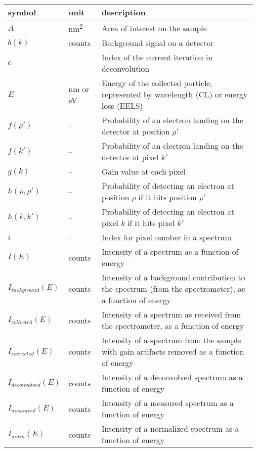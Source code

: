 \renewcommand{\arraystretch}{1.2}
\noindent 
\begin{longtable*}{l l p{11cm}} 
    \toprule
    \textbf{symbol} & \textbf{unit} & \textbf{description}\\
    \midrule 
    $A$ & \si{\nano\metre^2} & Area of interest on the sample\\
    $b(k)$ & counts & Background signal on a detector\\
    $c$ & -- & Index of the current iteration in deconvolution \\
    $E$ & \si{\nano\metre} or \si{\electronvolt} & Energy of the collected particle,
    represented by wavelength (CL) or energy loss (EELS)\\
    $f(\rho')$ & -- & Probability of an electron landing on the detector at position
    $\rho'$\\
    $f(k')$ & -- & Probability of an electron landing on the detector at pixel
    $k'$\\
    $g(k)$ & -- & Gain value at each pixel\\
    $h(\rho, \rho')$ & -- & Probability of detecting an electron at position $\rho$
    if it hits position $\rho'$\\
    $h(k, k')$ & -- & Probability of detecting an electron at pixel $k$ if it hits
    pixel $k'$\\
    $i$ & -- & Index for pixel number in a spectrum\\
    $I(E)$ & counts & Intensity of a spectrum as a function of energy\\
    $I_{background}(E)$ & counts & Intensity of a background contribution to the
    spectrum (from the spectrometer), as a function of energy\\
    $I_{collected}(E)$ & counts & Intensity of a spectrum as received from the
    spectrometer, as a function of energy\\
    $I_{corrected}(E)$ & counts & Intensity of a spectrum from the sample with gain
    artifacts removed as a function of energy\\
    $I_{deconvolved}(E)$ & counts & Intensity of a deconvolved spectrum as a
    function of energy\\
    $I_{measured}(E)$ & counts & Intensity of a measured spectrum as a function of
    energy\\
    $I_{norm}(E)$ & counts & Intensity of a normalized spectrum as a function of
    energy\\

\end{longtable*}
